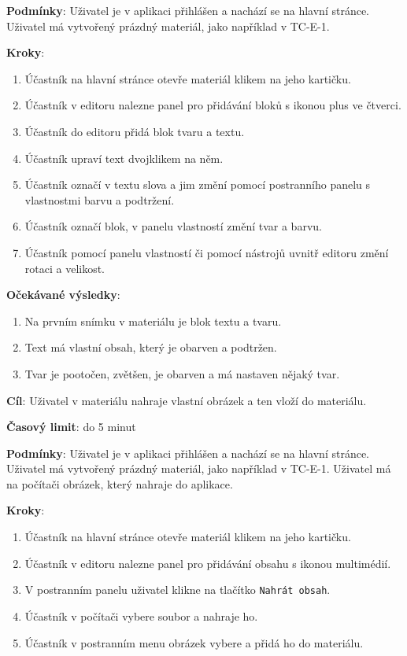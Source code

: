 \textbf{Podmínky}:  Uživatel je v aplikaci přihlášen a nachází se na hlavní stránce. Uživatel má vytvořený prázdný materiál, jako například v TC-E-1.

\textbf{Kroky}:

\begin{enumerate}[leftmargin=1.4cm]
    \item Účastník na hlavní stránce otevře materiál klikem na jeho kartičku.
    \item Účastník v editoru nalezne panel pro přidávání bloků s ikonou plus ve čtverci.
    \item Účastník do editoru přidá blok tvaru a textu.
    \item Účastník upraví text dvojklikem na něm.
    \item Účastník označí v textu slova a jim změní pomocí postranního panelu s vlastnostmi barvu a podtržení.
    \item Účastník označí blok, v panelu vlastností změní tvar a barvu.
    \item Účastník pomocí panelu vlastností či pomocí nástrojů uvnitř editoru změní rotaci a velikost.
\end{enumerate}

\textbf{Očekávané výsledky}:

\begin{enumerate}[leftmargin=1.4cm]
    \item Na prvním snímku v materiálu je blok textu a tvaru.
    \item Text má vlastní obsah, který je obarven a podtržen.
    \item Tvar je pootočen, zvětšen, je obarven a má nastaven nějaký tvar. 
\end{enumerate}






\vspace{1em}

\textbf{Cíl}: Uživatel v materiálu nahraje vlastní obrázek a ten vloží do materiálu.

\textbf{Časový limit}: do 5 minut

\textbf{Podmínky}:  Uživatel je v aplikaci přihlášen a nachází se na hlavní stránce. Uživatel má vytvořený prázdný materiál, jako například v TC-E-1. Uživatel má na počítači obrázek, který nahraje do aplikace.

\textbf{Kroky}:

\begin{enumerate}[leftmargin=1.4cm]
    \item Účastník na hlavní stránce otevře materiál klikem na jeho kartičku.
    \item Účastník v editoru nalezne panel pro přidávání obsahu s ikonou multimédií.
    \item V postranním panelu uživatel klikne na tlačítko \verb|Nahrát obsah|.
    \item Účastník v počítači vybere soubor a nahraje ho.
    \item Účastník v postranním menu obrázek vybere a přidá ho do materiálu.
\end{enumerate}

